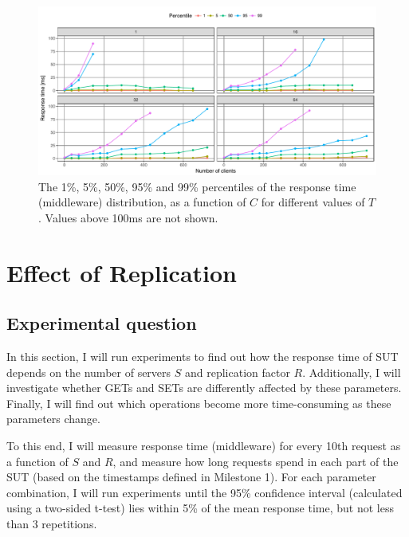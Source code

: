 \documentclass[11pt]{article}
\begin{document}
\begin{figure}[p]
\centering
\includegraphics[width=\textwidth]{../results/throughput/graphs/response_time_vs_clients.pdf}
\caption{The 1\%, 5\%, 50\%, 95\% and 99\% percentiles of the response time (middleware) distribution, as a function of $C$ for different values of $T$. Values above 100ms are not shown.}
\label{fig:exp1:res:responsetime}
\end{figure}



\clearpage
\section{Effect of Replication}
\label{sec:exp2}

\subsection{Experimental question}

In this section, I will run experiments to find out how the response time of SUT depends on the number of servers $S$ and replication factor $R$. Additionally, I will investigate whether GETs and SETs are differently affected by these parameters. Finally, I will find out which operations become more time-consuming as these parameters change.

To this end, I will measure response time (middleware) for every 10th request as a function of $S$ and $R$, and measure how long requests spend in each part of the SUT (based on the timestamps defined in Milestone 1). For each parameter combination, I will run experiments until the 95\% confidence interval (calculated using a two-sided t-test) lies within 5\% of the mean response time, but not less than 3 repetitions.
\end{document}
